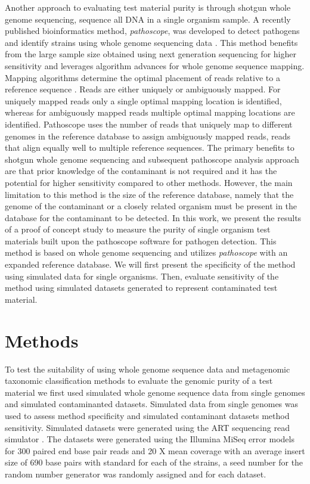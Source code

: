 \documentclass[fleqn,10pt,lineno]{wlpeerj}\usepackage[]{graphicx}\usepackage[]{color}
\begin{document}
Another approach to evaluating test material purity is through shotgun whole genome sequencing, sequence all DNA in a single organism sample.  A recently published bioinformatics method, \textit{pathoscope}, was developed to detect pathogens and identify strains using whole genome sequencing data \citep{Francis2013}.  This method benefits from the large sample size obtained using next generation sequencing for higher sensitivity and leverages algorithm advances for whole genome sequence mapping.  Mapping algorithms determine the optimal placement of reads relative to a reference sequence \citep{Schbath2012}.  Reads are either uniquely or ambiguously mapped.  For uniquely mapped reads only a single optimal mapping location is identified, whereas for ambiguously mapped reads multiple optimal mapping locations are identified.  Pathoscope uses the number of reads that uniquely map to different genomes in the reference database to assign ambiguously mapped reads, reads that align equally well to multiple reference sequences.  The primary benefits to shotgun whole genome sequencing and subsequent pathoscope analysis approach are that prior knowledge of the contaminant is not required and it has the potential for higher sensitivity compared to other methods.  However, the main limitation to this method is the size of the reference database, namely that the genome of the contaminant or a closely related organism must be present in the database for the contaminant to be detected.  In this work, we present the results of a proof of concept study to measure the purity of single organism test materials built upon the pathoscope software for pathogen detection.  This method is based on whole genome sequencing and utilizes \textit{pathoscope} with an expanded reference database.  We will first present the specificity of the method using simulated data for single organisms.  Then, evaluate sensitivity of the method using simulated datasets generated to represent contaminated test material.  


\section*{Methods}
To test the suitability of using whole genome sequence data and metagenomic taxonomic classification methods to evaluate the genomic purity of a test material we first used simulated whole genome sequence data from single genomes and simulated contaminanted datasets. 
Simulated data from single genomes was used to assess method specificity and simulated contaminant datasets method sensitivity. Simulated datasets were generated using the ART sequencing read simulator \citep{Huang2012}. 
The datasets were generated using the Illumina MiSeq error models for 300 paired end base pair reads and 20 X mean coverage with an average insert size of 690 base pairs with standard for each of the strains, 
a seed number for the random number generator was randomly assigned and for each dataset. 
\end{document}
